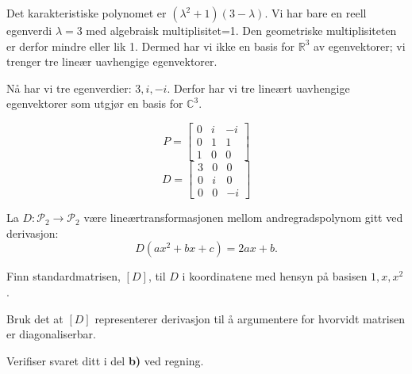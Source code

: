 \begin{losning}

\begin{punkt}
Det karakteristiske polynomet er $(\lambda^2+1)(3-\lambda)$. Vi har bare en reell egenverdi $\lambda=3$ med algebraisk multiplisitet=1. Den geometriske multiplisiteten er derfor mindre eller lik 1. Dermed har vi ikke en basis for $\mathbb{R}^3$ av egenvektorer; vi trenger tre lineær uavhengige egenvektorer. 
\end{punkt}

\begin{punkt}
Nå har vi tre egenverdier: $3,i,-i$. Derfor har vi tre lineært uavhengige egenvektorer som utgjør en basis for $\mathbb{C}^3$.
\end{punkt}

\begin{punkt}
$$P=\begin{bmatrix}
0 & i & -i\\
0 & 1 & 1\\
1 & 0 & 0
\end{bmatrix}$$
$$D=\begin{bmatrix}
3 & 0 & 0\\
0 & i & 0\\
0 & 0 & -i
\end{bmatrix}$$
\end{punkt}

\end{losning}

\begin{oppgave}
La $D:\mathcal{P}_2\rightarrow \mathcal{P}_2$ være lineærtransformasjonen mellom andregradspolynom gitt ved derivasjon: $$D(ax^2+bx+c)=2ax+b.$$

\begin{punkt}
Finn standardmatrisen, $[D]$, til $D$ i koordinatene med hensyn på basisen $1,x,x^2$.
\end{punkt}

\begin{punkt}
Bruk det at $[D]$ representerer derivasjon til å argumentere for hvorvidt matrisen er diagonaliserbar.
\end{punkt}

\begin{punkt}
Verifiser svaret ditt i del \textbf{b)} ved regning. 
\end{punkt}


\end{oppgave}

